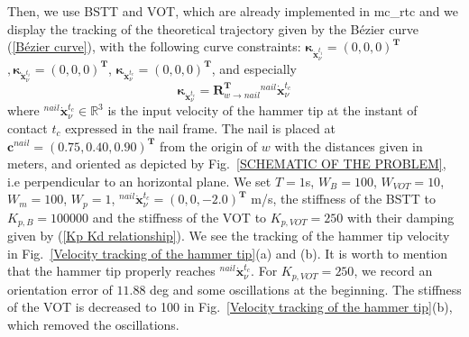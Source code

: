 \documentclass[conference]{IEEEtran}
\begin{document}
Then, we use BSTT and VOT, which are already implemented in mc\_rtc and we display the tracking of the theoretical trajectory given by the Bézier curve (\ref{Bézier curve}), with the following curve constraints: 
$\bm {\kappa}_{\mathbf{\dot x}_{\nu}^{t_i}} = (0, 0, 0)^\mathbf{T}$ 
$,
\bm {\kappa}_{\mathbf{\ddot x}_{\nu}^{t_i}} = (0, 0, 0)^\mathbf{T}
$,
$
\bm {\kappa}_{\mathbf{\ddot x}_{\nu}^{t_c}} = (0, 0, 0)^\mathbf{T}
$, and especially
\begin{equation}
 \bm {\kappa}_{\mathbf{\dot x}_{\nu}^{t_c}} = \mathbf{R}_{w \to nail}^{\mathbf{T}} {}^{nail}\mathbf{\dot x}_{\nu}^{t_c} 
\end{equation}
where ${{}^{nail}\mathbf{\dot x}_{\nu}^{t_c}} \in \mathbb{R}^3$ is the input velocity of the hammer tip at the instant of contact $t_c$ expressed in the nail frame. 
The nail is placed at $\mathbf{c}^{nail} = (0.75, 0.40, 0.90)^\mathbf{T}$ from the origin of $w$ with the distances given in meters, and oriented as depicted by Fig.~\ref{SCHEMATIC OF THE PROBLEM}, i.e perpendicular to an horizontal plane. 
We set $T = 1$s, $W_{B} = 100$, $W_{VOT} = 10$, $W_{m} = 100$, $W_{p} = 1$, ${}^{nail}\mathbf{\dot x}_{\nu}^{t_c} = (0, 0 ,  -2.0) ^\mathbf{T}$ m/s, the stiffness of the BSTT to $K_{p, B} = 100000$ and the stiffness of the VOT to $K_{p, VOT} = 250$ with their damping given by (\ref{Kp Kd relationship}). 
We see the tracking of the hammer tip velocity in Fig.~\ref{Velocity tracking of the hammer tip}(a) and (b). 
It is worth to mention that the hammer tip properly reaches ${}^{nail}\mathbf{\dot x}_{\nu}^{t_c}$.
For $K_{p, VOT} = 250$, we record an orientation error of $11.88$ deg and some oscillations at the beginning. 
The stiffness of the VOT is decreased to 100 in Fig.~\ref{Velocity tracking of the hammer tip}(b), which removed the oscillations. 
\end{document}
